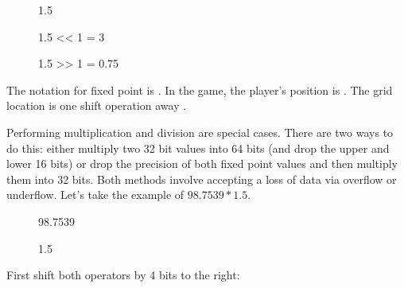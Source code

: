  \par
\begin{figure}[H]
 \centering
   
   \caption{1.5} 
\end{figure} 

\par
\begin{figure}[H]
 \centering
   
   \caption{1.5 << 1  = 3} 
\end{figure}

\par
\begin{figure}[H]
 \centering
   
   \caption{1.5 >> 1 = 0.75} 
\end{figure}

The notation for fixed point is . In the game, the player's position is . The grid location is one shift operation away .\\
\par
Performing multiplication and division are special cases. There are two ways to do this: either multiply two 32 bit values into 64 bits (and drop the upper and lower 16 bits) or drop the precision of both fixed point values and then multiply them into 32 bits. Both methods involve accepting a loss of data via overflow or underflow. Let's take the example of $98.7539 * 1.5$.


\par
\begin{figure}[H]
 \centering
   
   \caption{98.7539} 
\end{figure} 
\par
\begin{figure}[H]
 \centering
   
   \caption{1.5} 
\end{figure} 
\par
First shift both operators by 4 bits to the right:\\
\par
\begin{figure}[H]
 \centering
   
\end{figure} 
\par
\begin{figure}[H]
 \centering
   
\end{figure} 
\par

